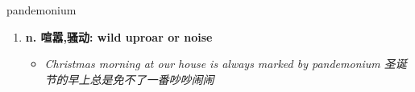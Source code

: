 
\begin{frame}
{\huge pandemonium}
\begin{center}
\begin{enumerate}\Large
  \item \textbf{n. 喧嚣,骚动: wild uproar or noise}
  \begin{itemize}
    \item \em{\Large{Christmas morning at our house is always marked by pandemonium 圣诞节的早上总是免不了一番吵吵闹闹}}
  \end{itemize}
\end{enumerate}
\end{center}
\end{frame}
